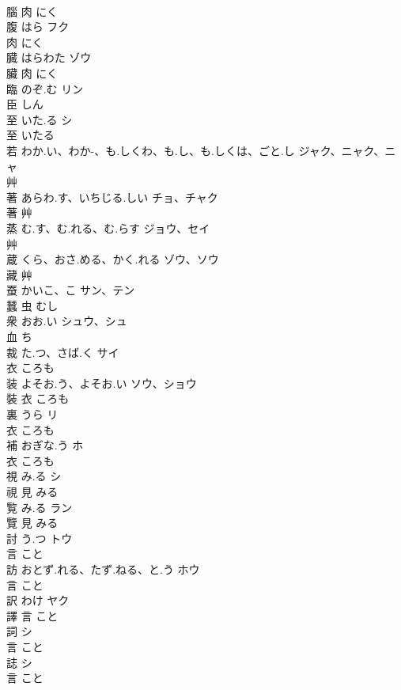 \documentclass[8pt]{extreport}
\begin{document}
\begin{CJK}{UTF8}{min}
\\	腦	肉		にく		
\\	腹	はら	フク	
\\	肉		にく		
\\	臓	はらわた	ゾウ	
\\	臟	肉		にく		
\\	臨	のぞ.む	リン	
\\	臣		しん		
\\	至	いた.る	シ	
\\	至		いたる		
\\	若	わか.い、わか-、も.しくわ、も.し、も.しくは、ごと.し	ジャク、ニャク、ニャ	
\\	艸				
\\	著	あらわ.す、いちじる.しい	チョ、チャク	
\\	著	艸				
\\	蒸	む.す、む.れる、む.らす	ジョウ、セイ	
\\	艸				
\\	蔵	くら、おさ.める、かく.れる	ゾウ、ソウ	
\\	藏	艸				
\\	蚕	かいこ、こ	サン、テン	
\\	蠶	虫		むし		
\\	衆	おお.い	シュウ、シュ	
\\	血		ち		
\\	裁	た.つ、さば.く	サイ	
\\	衣		ころも		
\\	装	よそお.う、よそお.い	ソウ、ショウ	
\\	裝	衣		ころも		
\\	裏	うら	リ	
\\	衣		ころも		
\\	補	おぎな.う	ホ	
\\	衣		ころも		
\\	視	み.る	シ	
\\	視	見		みる		
\\	覧	み.る	ラン	
\\	覽	見		みる		
\\	討	う.つ	トウ	
\\	言		こと		
\\	訪	おとず.れる、たず.ねる、と.う	ホウ	
\\	言		こと		
\\	訳	わけ	ヤク	
\\	譯	言		こと		
\\	詞		シ	
\\	言		こと		
\\	誌		シ	
\\	言		こと		

\end{CJK}
\end{document}
